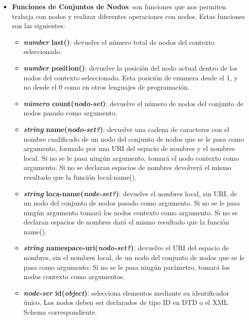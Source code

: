 \begin{itemize}
    \item \textbf{Funciones de Conjuntos de Nodos}: son funciones que nos permiten trabaja con nodos y realizar diferentes operaciones con nodos. Estas funciones son las siguientes:

    \begin{itemize}
        \item \textbf{\textit{number} last()}: devuelve el número total de nodos del contexto seleccionado.
        \item \textbf{\textit{number} position()}: devuelve la posición del nodo actual dentro de los nodos del contexto seleccionado. Esta posición de enumera desde el 1, y no desde el 0 como en otros lenguajes de programación.
        \item \textbf{\textit{número} count(\textit{nodo-set})}: devuelve el número de nodos del conjunto de nodos pasado como argumento.
        \item \textbf{\textit{string} name(\textit{nodo-set?})}: devuelve una cadena de caracteres con el nombre cualificado de un nodo del conjunto de nodos que se le pasa como argumento, formado por una URI del espacio de nombres y el nombres local. Si no se le pasa ningún argumento, tomará el nodo contexto como argumento. Si no se declaran espacios de nombres devolverá el mismo resultado que la función local-name().
        \item \textbf{\textit{string} loca-name(\textit{node-set?})}: devuelve el nombres local, sin URI, de un nodo del conjunto de nodos pasado como argumento. Si no se le pasa ningún argumento tomará los nodos contexto como argumento. Si no se declaran espacios de nombres dará el mismo resultado que la función name().
        \item \textbf{\textit{string} namespace-uri(\textit{nodo-set?})}: devuelve el URI del espacio de nombres, sin el nombres local, de un nodo del conjunto de nodos que se le pasa como argumento. Si no se le pasa ningún parámetro, tomará los nodos contexto como argumentos.
        \item \textbf{\textit{node-ser} id(\textit{object})}: selecciona elementos mediante su identificador único. Los nodos deben ser declarados de tipo ID en DTD o el XML Schema correspondiente.
    \end{itemize}


\end{itemize}
